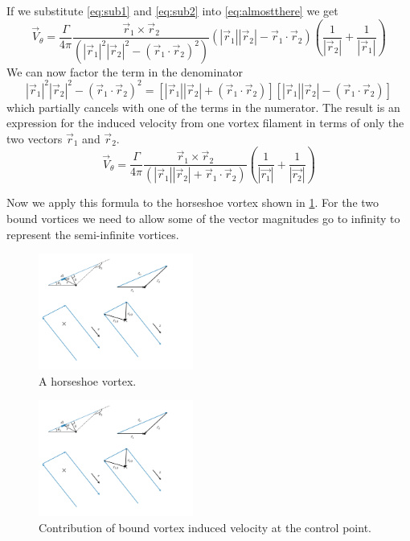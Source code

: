\documentclass{article}
\begin{document}
If we substitute \cref{eq:sub1} and \cref{eq:sub2} into \cref{eq:almostthere} we get 
\begin{equation}
\vec{V}_\theta = \frac{\Gamma}{4 \pi} \frac{\vec{r}_1 \times \vec{r}_2}{(|\vec{r}_1|^2|\vec{r}_2|^2 - (\vec{r}_1 \cdot \vec{r}_2)^2)} (|\vec{r}_1||\vec{r}_2| - \vec{r}_1 \cdot \vec{r}_2 )\left(\frac{1}{|\vec{r}_2|} + \frac{1}{|\vec{r}_1|} \right)
\end{equation}
We can now factor the term in the denominator
\begin{equation}
|\vec{r}_1|^2|\vec{r}_2|^2 - (\vec{r}_1 \cdot \vec{r}_2)^2 = \left[|\vec{r}_1||\vec{r}_2| + (\vec{r}_1 \cdot \vec{r}_2)\right] \left[|\vec{r}_1||\vec{r}_2| - (\vec{r}_1 \cdot \vec{r}_2) \right]
\end{equation}
which partially cancels with one of the terms in the numerator.  The result is an expression for the induced velocity from one vortex filament in terms of only the two vectors $\vec{r}_1$ and $\vec{r}_2$. 
\begin{equation}
\vec{V}_\theta = \frac{\Gamma}{4 \pi} \frac{\vec{r}_1 \times \vec{r}_2}{(|\vec{r}_1||\vec{r}_2| + \vec{r}_1 \cdot \vec{r}_2)} \left(\frac{1}{|\vec{r_1}|} + \frac{1}{|\vec{r_2}|} \right)
\label{eq:segment}
\end{equation}

Now we apply this formula to the horseshoe vortex shown in \cref{fig:horseshoevortex}.  For the two bound vortices we need to allow some of the vector magnitudes go to infinity to represent the semi-infinite vortices.  
\begin{figure}[htbp]
\centering
\includegraphics[width=2in]{figs/horseshoevortex}
\caption{A horseshoe vortex.}
\label{fig:horseshoevortex}
\end{figure}

\begin{figure}[htbp]
\centering
\includegraphics[width=2in]{figs/boundvortex}
\caption{Contribution of bound vortex induced velocity at the control point.}
\label{fig:boundvortex}
\end{figure}
\end{document}
